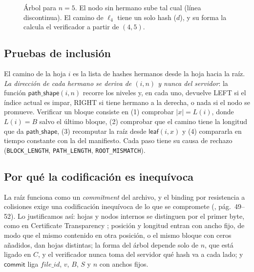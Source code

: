 \documentclass[11pt,a4paper]{article}
\newcommand{\cause}[1]{\texttt{\small #1}}
\begin{document}
\begin{figure}[ht]
\centering
{}
\caption{Árbol para $n=5$. El nodo sin hermano sube tal cual (línea discontinua). El camino de
$\ell_4$ tiene un solo hash ($d$), y su forma la calcula el verificador a partir de $(4,5)$.}
\label{fig:arbol}
\end{figure}

\subsection{Pruebas de inclusión}
El camino de la hoja $i$ es la lista de hashes hermanos desde la hoja hacia la raíz. \emph{La
dirección de cada hermano se deriva de $(i,n)$ y nunca del servidor}: la función
$\mathsf{path\_shape}(i,n)$ recorre los niveles y, en cada uno, devuelve LEFT si el índice actual es
impar, RIGHT si tiene hermano a la derecha, o nada si el nodo se promueve. Verificar un bloque
consiste en (1) comprobar $|x|=L(i)$, donde $L(i)=B$ salvo el último bloque, (2) comprobar que el
camino tiene la longitud que da $\mathsf{path\_shape}$, (3) recomputar la raíz desde
$\mathsf{leaf}(i,x)$ y (4) compararla en tiempo constante con la del manifiesto. Cada paso tiene su
causa de rechazo (\cause{BLOCK\_LENGTH}, \cause{PATH\_LENGTH}, \cause{ROOT\_MISMATCH}).

\subsection{Por qué la codificación es inequívoca}
La raíz funciona como un \emph{commitment} del archivo, y el binding por resistencia a colisiones
exige una codificación inequívoca de lo que se compromete (\cite{vp}, pág.~49--52). Lo
justificamos así: hojas y nodos internos se distinguen por el primer byte, como en Certificate Transparency \cite{rfc9162}; posición y longitud entran
con ancho fijo, de modo que el mismo contenido en otra posición, o el mismo bloque con ceros
añadidos, dan hojas distintas; la forma del árbol depende solo de $n$, que está ligado en $C$, y el
verificador nunca toma del servidor qué hash va a cada lado; y $\mathsf{commit}$ liga
$\mathit{file\_id}$, $v$, $B$, $S$ y $n$ con anchos fijos.
\end{document}
